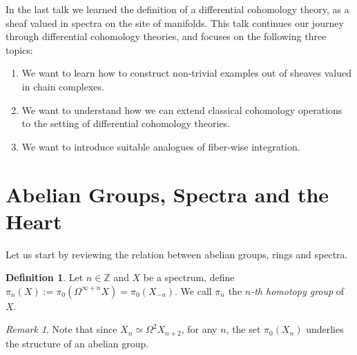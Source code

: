 \documentclass[a4paper]{book}
\newcommand{\bZ}{\mathbb{Z}}
\theoremstyle{definition}
\newtheorem{definition}[equation]{Definition}
\theoremstyle{remark}
\newtheorem{remark}[equation]{Remark}
\numberwithin{equation}{section}
\begin{document}
In the last talk we learned the definition of a differential cohomology theory, as a sheaf valued in spectra on the site of manifolds. This talk continues our journey through differential cohomology theories, and focuses on the following three topics:
\begin{enumerate}
  \item We want to learn how to construct non-trivial examples out of sheaves valued in chain complexes.
  \item We want to understand how we can extend classical cohomology operations to the setting of differential cohomology theories.
  \item We want to introduce suitable analogues of fiber-wise integration.  
\end{enumerate}

\section{Abelian Groups, Spectra and the Heart}
Let us start by reviewing the relation between abelian groups, rings and spectra. 
\begin{definition}
    Let $n\in\bZ$ and $X$ be a spectrum, define $\pi_n(X):=\pi_0(\Omega^{\infty+n}X)=\pi_0(X_{-n})$. We call $\pi_n$ the \textit{$n$-th homotopy group} of $X$. 
\end{definition}
\begin{remark}
 Note that since $X_n\simeq\Omega^2X_{n+2}$, for any $n$, the set $\pi_0(X_n)$ underlies the structure of an abelian group.
\end{remark}
\end{document}
